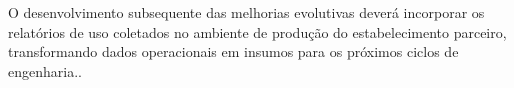 \documentclass[
	12pt,				%
	openany,			%
	oneside,			%
	a4paper,			%
	english,			%
	french,				%
	spanish,			%
	brazil				%
	]{abntex2}
\begin{document}
O desenvolvimento subsequente das melhorias evolutivas deverá incorporar os relatórios de uso coletados no ambiente de produção do estabelecimento parceiro, transformando dados operacionais em insumos para os próximos ciclos de engenharia..

\postextual



\end{document}
